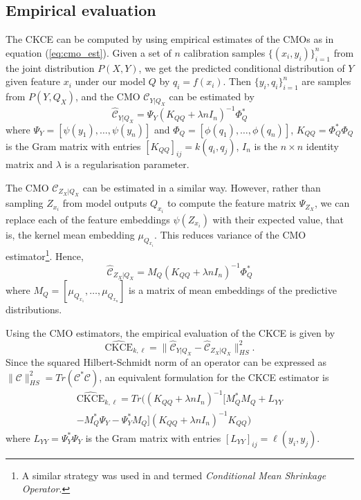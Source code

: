 \documentclass[twocolumn]{article}
\theoremstyle{definition}
\begin{document}
\subsection{Empirical evaluation}

The CKCE can be computed by using empirical estimates of the CMOs as in equation (\ref{eq:cmo_est}). Given a set of $n$ calibration samples $\{(x_i,y_i) \}_{i=1}^n$ from the joint distribution $P(X, Y)$, we get the predicted conditional distribution of $Y$ given feature $x_i$ under our model $Q$ by $q_i = f(x_i)$. Then $\{y_i, q_i \}_{i=1}^n$ are samples from $P(Y, Q_X)$, and the CMO $\mathcal{C}_{Y|Q_X}$ can be estimated by
\begin{equation*}
    \widehat{\mathcal C}_{Y | Q_X} = \Psi_Y (K_{QQ} + \lambda n I_n)^{-1} \Phi_Q^*
\end{equation*}
where $\Psi_Y = [\psi(y_1), \dots, \psi(y_n)]$ and $\Phi_Q = [\phi(q_1), \dots, \phi(q_n)]$, $K_{QQ} = \Phi_Q^* \Phi_Q$ is the Gram matrix with entries $[K_{QQ}]_{ij} = k(q_i, q_j)$, $I_n$ is the $n\times n$ identity matrix and $\lambda$ is a regularisation parameter. 

The CMO $\mathcal{C}_{Z_X|Q_X}$ can be estimated in a similar way. However, rather than sampling $Z_{x_i}$ from model outputs $Q_{x_i}$ to compute the feature matrix $\Psi_{Z_X}$, we can replace each of the feature embeddings $\psi(Z_{x_i})$ with their expected value, that is, the kernel mean embedding $\mu_{Q_{x_i}}$. This reduces variance of the CMO estimator\footnote{A similar strategy was used in \citet{ChaBouSej2021} and termed \textit{Conditional Mean Shrinkage Operator}.}. Hence, 
\begin{equation*}
    \widehat{\mathcal C}_{Z_X | Q_X} = M_Q (K_{QQ} + \lambda n I_n)^{-1} \Phi_Q^*
\end{equation*}
where $M_Q = [\mu_{Q_{x_1}}, \dots, \mu_{Q_{x_n}}]$ is a matrix of mean embeddings of the predictive distributions. 

Using the CMO estimators, the empirical evaluation of the CKCE is given by
\begin{equation*}
    \widehat{\text{CKCE}}_{k, \ell} = \| \widehat{\mathcal C}_{Y | Q_X} - \widehat{\mathcal C}_{Z_X | Q_X} \|_{HS}^2.
\end{equation*}
Since the squared Hilbert-Schmidt norm of an operator can be expressed as $\|\mathcal{C}\|_{HS}^2 = Tr(\mathcal{C}^* \mathcal{C})$, an equivalent formulation for the CKCE estimator is
\begin{multline*}
    \widehat{\text{CKCE}}_{k, \ell} = Tr\Big( (K_{QQ} + \lambda n I_n)^{-1} [M_Q^* M_Q + L_{YY} \\ - M_Q^* \Psi_Y - \Psi_Y^* M_Q] (K_{QQ} + \lambda n I_n)^{-1} K_{QQ} \Big)
\end{multline*}
where $L_{YY} = \Psi_Y^* \Psi_Y$ is the Gram matrix with entries $[L_{YY}]_{ij} = \ell(y_i, y_j)$.
\end{document}
